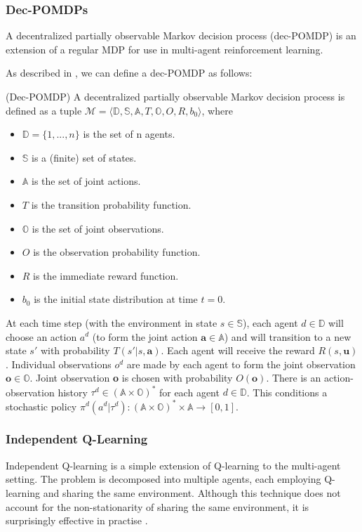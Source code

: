 \subsubsection{Dec-POMDPs}
A decentralized partially observable Markov decision process (dec-POMDP) is an extension of a regular MDP for use in multi-agent reinforcement learning. 

As described in \cite{dec-pomdp}, we can define a dec-POMDP as follows:
\begin{definition}\textbf{}{ (Dec-POMDP)}
A decentralized partially observable Markov decision
process is defined as a tuple $\mathscr{M} = \langle \mathbb{D,S,A},T,\mathbb{O},O,R,b_0\rangle$, where
\begin{itemize}
    \item $\mathbb{D}=\{1,...,n\}$ is the set of n agents.
    \item $\mathbb{S}$ is a (finite) set of states.
    \item $\mathbb{A}$ is the set of joint actions.
    \item $T$ is the transition probability function.
    \item $\mathbb{O}$ is the set of joint observations.
    \item $O$ is the observation probability function.
    \item $R$ is the immediate reward function.
    \item $b_0$ is the initial state distribution at time $t = 0$.
    
\end{itemize}
\end{definition}

At each time step (with the environment in state $s \in \mathbb{S}$), each agent $d \in \mathbb{D}$ will choose an action $a^d$ (to form the joint action $\textbf{a} \in \mathbb{A}$) and will transition to a new state $s'$ with probability $T(s'|s,\textbf{a})$. Each agent will receive the reward $R(s, \textbf{u})$. Individual observations $o^d$ are made by each agent to form the joint observation $\textbf{o} \in \mathbb{O}$. Joint observation \textbf{o} is chosen with probability $O(\textbf{o})$. There is an action-observation history $\tau^d \in (\mathbb{A} \times \mathbb{O})^*$ for each agent $d \in \mathbb{D}$. This conditions a stochastic policy $\pi^d(a^d|\tau^d) : (\mathbb{A} \times \mathbb{O})^* \times \mathbb{A} \to [0, 1]$.

\subsubsection{Independent Q-Learning}
Independent Q-learning \cite{IQL} is a simple extension of Q-learning to the multi-agent setting. The problem is decomposed into multiple agents, each employing Q-learning and sharing the same environment. Although this technique does not account for the non-stationarity of sharing the same environment, it is surprisingly effective in practise \cite{iqlisgood}.


